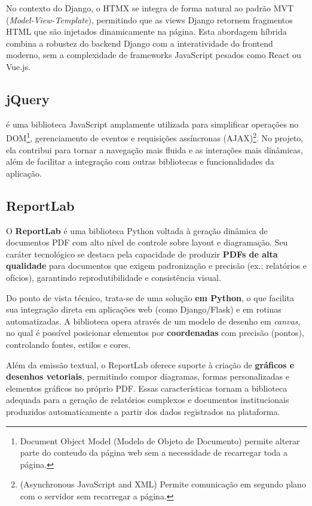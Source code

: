 \par No contexto do Django, o HTMX se integra de forma natural ao padrão MVT (\textit{Model-View-Template}), permitindo que as views Django retornem fragmentos HTML que são injetados dinamicamente na página. Esta abordagem híbrida combina a robustez do backend Django com a interatividade do frontend moderno, sem a complexidade de frameworks JavaScript pesados como React ou Vue.js.

\subsection{jQuery}\label{jQuery}
\par {} é uma biblioteca JavaScript amplamente utilizada para simplificar operações no DOM\footnote{Document Object Model (Modelo de Objeto de Documento) permite alterar parte do conteudo da página web sem a necessidade de recarregar toda a página.}, gerenciamento de eventos e requisições assíncronas (AJAX)\footnote{(Asynchronous JavaScript and XML) Permite comunicação em segundo plano com o servidor sem recarregar a página.}. No projeto, ela contribui para tornar a navegação mais fluida e as interações mais dinâmicas, além de facilitar a integração com outras bibliotecas e funcionalidades da aplicação.

\subsection{ReportLab}
\par O \textbf{ReportLab}  é uma biblioteca Python voltada à geração dinâmica de documentos PDF com alto nível de controle sobre layout e diagramação. Seu caráter tecnológico se destaca pela capacidade de produzir \textbf{PDFs de alta qualidade} para documentos que exigem padronização e precisão (ex.: relatórios e ofícios), garantindo reprodutibilidade e consistência visual.

\par Do ponto de vista técnico, trata-se de uma solução \textbf{em Python}, o que facilita sua integração direta em aplicações web (como Django/Flask) e em rotinas automatizadas. A biblioteca opera através de um modelo de desenho em \textit{canvas}, no qual é possível posicionar elementos por \textbf{coordenadas} com precisão (pontos), controlando fontes, estilos e cores.

\par Além da emissão textual, o ReportLab oferece suporte à criação de \textbf{gráficos e desenhos vetoriais}, permitindo compor diagramas, formas personalizadas e elementos gráficos no próprio PDF. Essas características tornam a biblioteca adequada para a geração de relatórios complexos e documentos institucionais produzidos automaticamente a partir dos dados registrados na plataforma.

